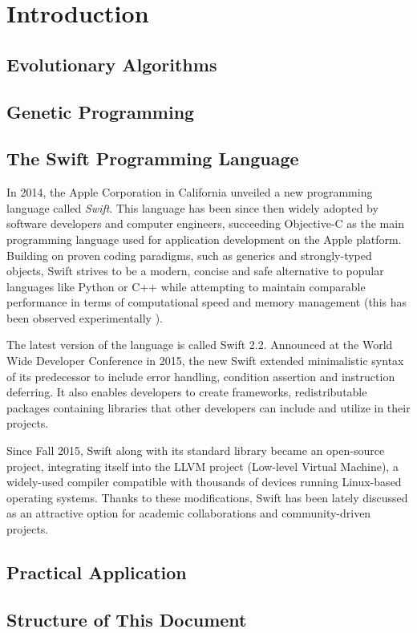 \chapter{Introduction}

\section{Evolutionary Algorithms}
\todo

\section{Genetic Programming}
\todo

\section{The Swift Programming Language}
In 2014, the Apple Corporation in California unveiled a new programming language called \textit{Swift}. This language has been since then widely adopted by software developers and computer engineers, succeeding Objective-C as the main programming language used for application development on the Apple platform. Building on proven coding paradigms, such as generics and strongly-typed objects, Swift strives to be a modern, concise and safe alternative to popular languages like Python or C++ while attempting to maintain comparable performance in terms of computational speed and memory management (this has been observed experimentally \cite{PrimateLabsBenchmark}).

The latest version of the language is called Swift 2.2. Announced at the World Wide Developer Conference in 2015, the new Swift extended minimalistic syntax of its predecessor to include error handling, condition assertion and instruction deferring. It also enables developers to create frameworks, redistributable packages containing libraries that other developers can include and utilize in their projects.

Since Fall 2015, Swift along with its standard library became an open-source project, integrating itself into the LLVM project (Low-level Virtual Machine), a widely-used compiler compatible with thousands of devices running Linux-based operating systems. Thanks to these modifications, Swift has been lately discussed as an attractive option for academic collaborations and community-driven projects.

\section{Practical Application}
\todo

\section{Structure of This Document}
\todo
